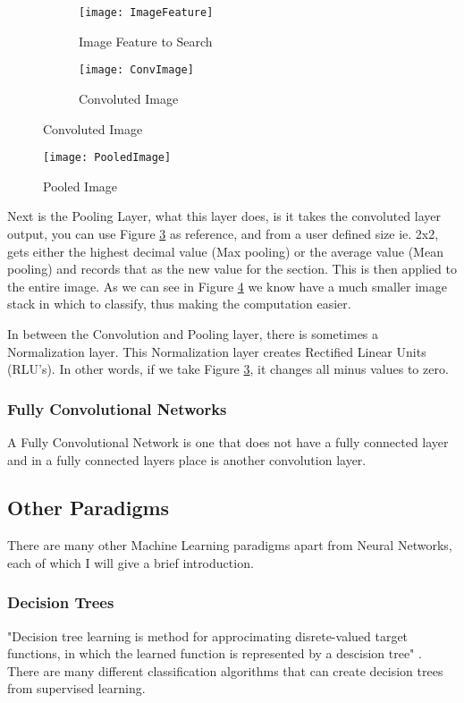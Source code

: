 \begin{figure}
      \begin{subfigure}[b]{0.4\textwidth}
          \texttt{[image: ImageFeature]}
          \caption{Image Feature to Search}
          \label{fig:feature}
      \end{subfigure}
      \begin{subfigure}[b]{0.4\textwidth}
           \texttt{[image: ConvImage]}
           \caption{Convoluted Image}
           \label{fig:convoluted}
      \end{subfigure}
\end{figure}
\begin{figure}
    \texttt{[image: PooledImage]}
    \caption{Pooled Image}
    \label{fig:pooled}
\end{figure}
Next is the Pooling Layer, what this layer does, is it takes the convoluted
layer output, you can use Figure \ref{fig:convoluted} as reference, and from a
user defined size ie. 2x2, gets either the highest decimal value (Max pooling)
or the average value (Mean pooling) and records that as the new value for the
section. This is then applied to the entire image. As we can see in Figure
\ref{fig:pooled} we know have a much smaller image stack in which to classify,
thus making the computation easier.

In between the Convolution and Pooling layer, there is sometimes a Normalization
layer. This Normalization layer creates Rectified Linear Units (RLU's). In other
words, if we take Figure \ref{fig:convoluted}, it changes all minus values to
zero.

\subsubsection{Fully Convolutional Networks}
A Fully Convolutional Network is one that does not have a fully connected layer
and in a fully connected layers place is another convolution layer.

\subsection{Other Paradigms}
There are many other Machine Learning paradigms apart from Neural Networks, each of which I will give a brief
introduction.

\subsubsection{Decision Trees}
"Decision tree learning is  method for approcimating disrete-valued target
functions, in which the learned function is represented by a descision tree"
\textcite{MLDT}. There are many different classification algorithms that can
create decision trees from supervised learning.

